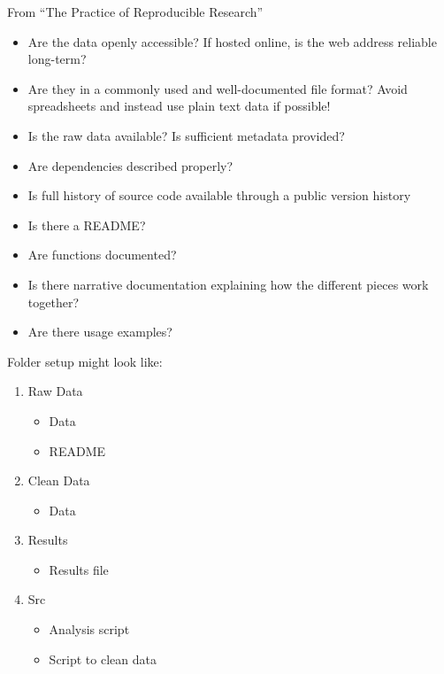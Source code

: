 \documentclass[12pt]{article}
\providecommand{\tightlist}{%
  \setlength{\itemsep}{0pt}\setlength{\parskip}{0pt}}
\begin{document}
\citet{marwick2018packaging}

From ``The Practice of Reproducible Research''

\begin{itemize}
\item
  Are the data openly accessible? If hosted online, is the web address
  reliable long-term?
\item
  Are they in a commonly used and well-documented file format? Avoid
  spreadsheets and instead use plain text data if possible!
\item
  Is the raw data available? Is sufficient metadata provided?
\item
  Are dependencies described properly?
\item
  Is full history of source code available through a public version
  history
\item
  Is there a README?
\item
  Are functions documented?
\item
  Is there narrative documentation explaining how the different pieces
  work together?
\item
  Are there usage examples?
\end{itemize}

Folder setup might look like:

\begin{enumerate}
\def\labelenumi{\arabic{enumi}.}
\tightlist
\item
  Raw Data

  \begin{itemize}
  \tightlist
  \item
    Data
  \item
    README
  \end{itemize}
\item
  Clean Data

  \begin{itemize}
  \tightlist
  \item
    Data
  \end{itemize}
\item
  Results

  \begin{itemize}
  \tightlist
  \item
    Results file
  \end{itemize}
\item
  Src

  \begin{itemize}
  \tightlist
  \item
    Analysis script
  \item
    Script to clean data
  \end{itemize}
\end{enumerate}
\end{document}
